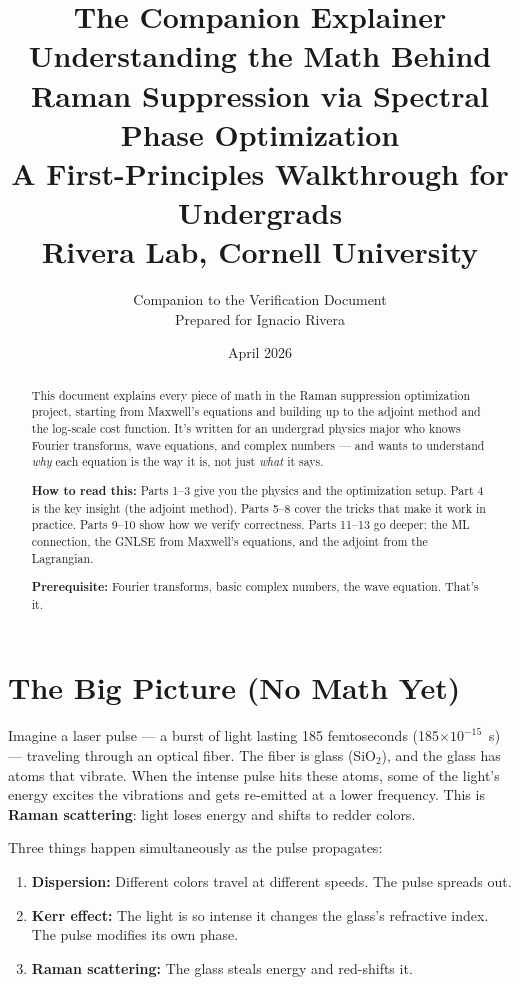 \documentclass[12pt,a4paper]{article}
\title{\textbf{The Companion Explainer}\\[6pt]
Understanding the Math Behind\\
Raman Suppression via Spectral Phase Optimization\\[12pt]
\large A First-Principles Walkthrough for Undergrads\\[6pt]
\normalsize Rivera Lab, Cornell University}
\author{Companion to the Verification Document\\
\small Prepared for Ignacio Rivera}
\date{April 2026}
\begin{document}
\maketitle
\thispagestyle{empty}

\begin{abstract}
This document explains every piece of math in the Raman suppression optimization project, starting from Maxwell's equations and building up to the adjoint method and the log-scale cost function. It's written for an undergrad physics major who knows Fourier transforms, wave equations, and complex numbers --- and wants to understand \emph{why} each equation is the way it is, not just \emph{what} it says.

\medskip\noindent\textbf{How to read this:} Parts 1--3 give you the physics and the optimization setup. Part 4 is the key insight (the adjoint method). Parts 5--8 cover the tricks that make it work in practice. Parts 9--10 show how we verify correctness. Parts 11--13 go deeper: the ML connection, the GNLSE from Maxwell's equations, and the adjoint from the Lagrangian.

\medskip\noindent\textbf{Prerequisite:} Fourier transforms, basic complex numbers, the wave equation. That's it.
\end{abstract}

\tableofcontents
\newpage

\section{The Big Picture (No Math Yet)}

Imagine a laser pulse --- a burst of light lasting 185 femtoseconds (185$\times 10^{-15}$~s) --- traveling through an optical fiber. The fiber is glass (SiO$_2$), and the glass has atoms that vibrate. When the intense pulse hits these atoms, some of the light's energy excites the vibrations and gets re-emitted at a lower frequency. This is \textbf{Raman scattering}: light loses energy and shifts to redder colors.

Three things happen simultaneously as the pulse propagates:
\begin{enumerate}
    \item \textbf{Dispersion:} Different colors travel at different speeds. The pulse spreads out.
    \item \textbf{Kerr effect:} The light is so intense it changes the glass's refractive index. The pulse modifies its own phase.
    \item \textbf{Raman scattering:} The glass steals energy and red-shifts it.
\end{enumerate}
\end{document}
